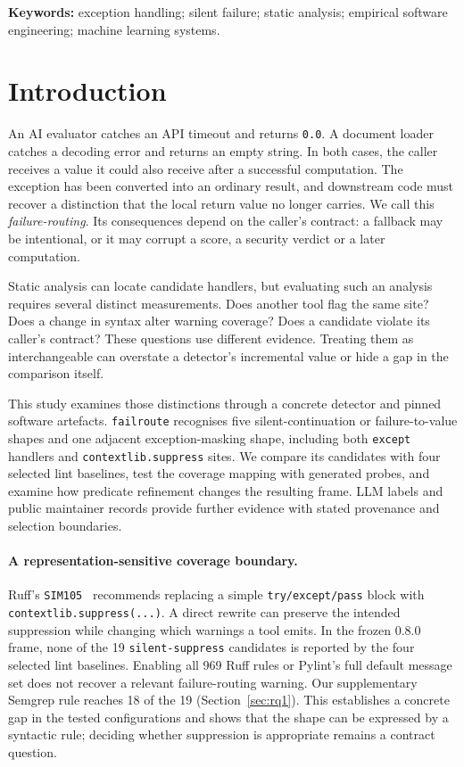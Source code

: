 \documentclass[10pt,a4paper]{article}
\let\cite\citep
\begin{document}
\noindent\textbf{Keywords:} exception handling; silent failure; static analysis;
empirical software engineering; machine learning systems.

\section{Introduction}

An AI evaluator catches an API timeout and returns \texttt{0.0}. A document
loader catches a decoding error and returns an empty string. In both cases,
the caller receives a value it could also receive after a successful
computation. The exception has been converted into an ordinary result, and
downstream code must recover a distinction that the local return value no
longer carries. We call this \emph{failure-routing}. Its consequences depend
on the caller's contract: a fallback may be intentional, or it may corrupt
a score, a security verdict or a later computation.

Static analysis can locate candidate handlers, but evaluating such an
analysis requires several distinct measurements. Does another tool flag
the same site? Does a change in syntax alter warning coverage? Does a
candidate violate its caller's contract? These questions use different
evidence. Treating them as interchangeable can overstate a detector's
incremental value or hide a gap in the comparison itself.

This study examines those distinctions through a concrete detector and
pinned software artefacts. \texttt{failroute} recognises five
silent-continuation or failure-to-value shapes and one adjacent
exception-masking shape, including both \texttt{except} handlers and
\texttt{contextlib.suppress} sites. We compare its candidates with four
selected lint baselines, test the coverage mapping with generated probes,
and examine how predicate refinement changes the resulting frame. LLM
labels and public maintainer records provide further evidence with stated
provenance and selection boundaries.

\paragraph{A representation-sensitive coverage boundary.}
Ruff's \texttt{SIM105}~\cite{ruffsim105} recommends replacing a simple
\texttt{try/except/pass} block with \texttt{contextlib.suppress(...)}.
A direct rewrite can preserve the intended suppression while changing
which warnings a tool emits. In the frozen 0.8.0 frame, none of the 19
\texttt{silent-suppress} candidates is reported by the four selected lint
baselines. Enabling all 969 Ruff rules or Pylint's full default message
set does not recover a relevant failure-routing warning. Our supplementary
Semgrep rule reaches 18
of the 19 (Section~\ref{sec:rq1}). This establishes a concrete gap in
the tested configurations and shows that the shape can be expressed by a
syntactic rule; deciding whether suppression is appropriate remains a
contract question.
\end{document}
